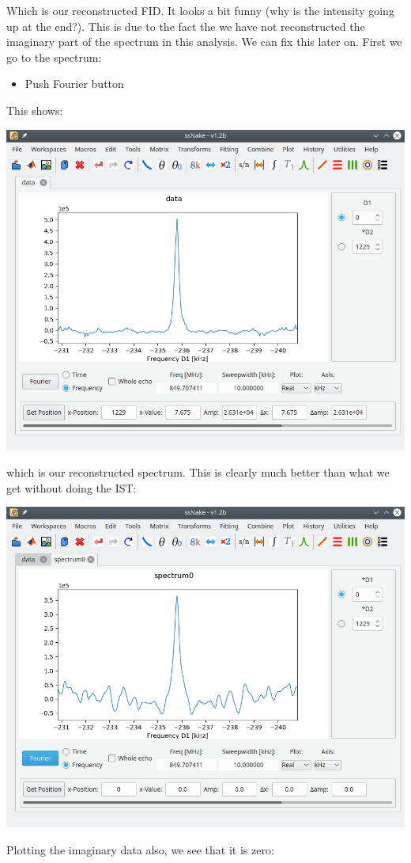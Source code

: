 \documentclass[11pt,a4paper]{article}
\begin{document}
Which is our reconstructed FID. It looks a bit funny (why is the intensity going
up at the end?). This is due to the fact the we have not reconstructed the
imaginary part of the spectrum in this analysis. We can fix this later on. First
we go to the spectrum:
\begin{itemize}
  \item Push Fourier button
\end{itemize}
This shows:
\begin{center}
\includegraphics[width=0.8\linewidth]{Figs/Fig5.png}
\end{center}
which is our reconstructed spectrum. This is clearly much better than what we get
without doing the IST:
\begin{center}
\includegraphics[width=0.8\linewidth]{Figs/Fig6.png}
\end{center}
Plotting the imaginary data also, we see that it is zero:
\end{document}
